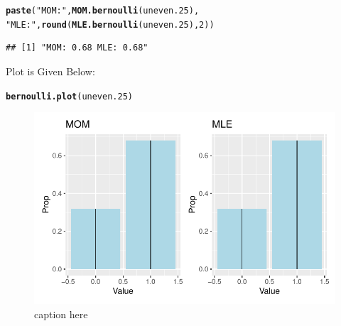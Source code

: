 \documentclass{article}\usepackage[]{graphicx}\usepackage[]{color}
\makeatletter
\def\maxwidth{ %
  \ifdim\Gin@nat@width>\linewidth
    \linewidth
  \else
    \Gin@nat@width
  \fi
}
\newcommand{\hlnum}[1]{\textcolor[rgb]{0.686,0.059,0.569}{#1}}%
\newcommand{\hlstr}[1]{\textcolor[rgb]{0.192,0.494,0.8}{#1}}%
\newcommand{\hlstd}[1]{\textcolor[rgb]{0.345,0.345,0.345}{#1}}%
\newcommand{\hlkwd}[1]{\textcolor[rgb]{0.737,0.353,0.396}{\textbf{#1}}}%
\newenvironment{kframe}{%
 \def\at@end@of@kframe{}%
 \ifinner\ifhmode%
  \def\at@end@of@kframe{\end{minipage}}%
  \begin{minipage}{\columnwidth}%
 \fi\fi%
 \def\FrameCommand##1{\hskip\@totalleftmargin \hskip-\fboxsep
 \colorbox{shadecolor}{##1}\hskip-\fboxsep
     \hskip-\linewidth \hskip-\@totalleftmargin \hskip\columnwidth}%
 \MakeFramed {\advance\hsize-\width
   \@totalleftmargin\z@ \linewidth\hsize
   \@setminipage}}%
 {\par\unskip\endMakeFramed%
 \at@end@of@kframe}
\newenvironment{knitrout}{}{} %
\makeatother
\begin{document}
\begin{enumerate}
\begin{enumerate}
\begin{knitrout}
\begin{kframe}
\begin{alltt}
\hlkwd{paste}\hlstd{(}\hlstr{"MOM:"}\hlstd{,} \hlkwd{MOM.bernoulli}\hlstd{(uneven.25),}
      \hlstr{"MLE:"}\hlstd{,} \hlkwd{round}\hlstd{(}\hlkwd{MLE.bernoulli}\hlstd{(uneven.25),}\hlnum{2}\hlstd{))}
\end{alltt}
\begin{verbatim}
## [1] "MOM: 0.68 MLE: 0.68"
\end{verbatim}
\end{kframe}
\end{knitrout}
Plot is Given Below:
\begin{knitrout}
\color{fgcolor}\begin{kframe}
\begin{alltt}
\hlkwd{bernoulli.plot}\hlstd{(uneven.25)}
\end{alltt}
\end{kframe}
\end{knitrout}
\begin{figure}[H]
  \begin{center}
\begin{knitrout}
\color{fgcolor}
\includegraphics[width=\maxwidth]{figure/unnamed-chunk-10-1} 
\end{knitrout}
    \caption{caption here}
    \label{p4plot4}%
  \end{center}
\end{figure}

\end{enumerate}
\end{enumerate}
\end{document}
